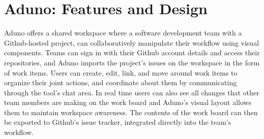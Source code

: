 \documentclass[conference]{IEEEtran}
\begin{document}
\section{Aduno: Features and Design}
\label{sec:concept}



Aduno offers a shared workspace where a software development team with a Github-hosted project, can collaboratively manipulate their workflow using visual components. Teams can sign in with their Github account details and access their repositories, and Aduno imports the project's issues on the workspace in the form of work items. Users can create, edit, link, and move around work items to organize their joint actions, and coordinate about them by communicating through the tool's chat area. In real time users can also see all changes that other team members are making on the work board and Aduno's visual layout allows them to maintain workspace awareness. The contents of the work board can then be exported to Github's issue tracker, integrated directly into the team's workflow.
\end{document}
